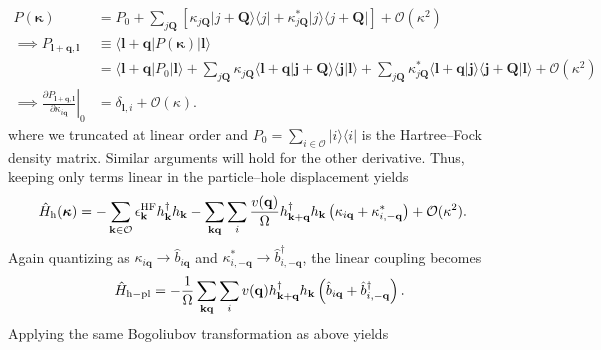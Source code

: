 \begin{align}
    P(\boldsymbol{\kappa})
    &=
    P_0
    +
    \sum_{j\mathbf Q}
    \left[
        \kappa_{j\mathbf Q}
        |j+\mathbf Q\rangle\langle j|
        +
        \kappa_{j\mathbf Q}^{*}
        |j\rangle\langle j+\mathbf Q|
    \right]
    +
    \mathcal O(\kappa^2)\\
\implies     P_{\mathbf l+\mathbf q,\mathbf l}
    &\equiv
    \langle \mathbf l+\mathbf q|
    P(\boldsymbol{\kappa})
    |\mathbf l\rangle
    \\
    &=
    \langle \mathbf l+\mathbf q|
    P_0
    |\mathbf l\rangle+
    \sum_{j\mathbf Q}
    \kappa_{j\mathbf Q}
    \langle \mathbf l+\mathbf q
    |\mathbf j+\mathbf Q\rangle
    \langle \mathbf j|\mathbf l\rangle+
    \sum_{j\mathbf Q}
    \kappa_{j\mathbf Q}^{*}
    \langle \mathbf l+\mathbf q
    |\mathbf j\rangle
    \langle \mathbf j+\mathbf Q|\mathbf l\rangle
    +
    \mathcal O(\kappa^2)\\
    \implies
    \left.
    \frac{\partial
    P_{\mathbf l+\mathbf q,\mathbf l}}
    {\partial\kappa_{i\mathbf q}}
    \right|_0
    &=
        \delta_{\mathbf l,i} + \mathcal O(\kappa).
\end{align}
where we truncated at linear order and $P_0=\sum_{i\in\mathcal O}|i\rangle\langle i|$ is the Hartree--Fock density matrix. Similar arguments will hold for the other derivative. Thus, keeping only terms linear in the particle--hole displacement yields
\begin{align}
    \hat H_{\rm h}(\boldsymbol{\kappa})
    &= -
    \sum_{\mathbf k\in\mathcal O}
    \epsilon_{\mathbf k}^{\rm HF}
    h_{\mathbf k}^{\dagger}h_{\mathbf k}
-
    \sum_{\mathbf k\mathbf q}
    \sum_i
    \frac{v(\mathbf q)}{\Omega}
    h_{\mathbf k+\mathbf q}^{\dagger}h_{\mathbf k}
    \left(
        \kappa_{i\mathbf q}
        +
        \kappa_{i,-\mathbf q}^{*}
    \right)
    +
    \mathcal O(\kappa^2).
    \label{eq:hole_hamiltonian_linear_kappa}
\end{align}
Again quantizing as $\kappa_{i\mathbf q} \to \hat b_{i\mathbf q}$ and $\kappa_{i,-\mathbf q}^{*} \to \hat b_{i,-\mathbf q}^{\dagger}$, 
the linear coupling becomes
\begin{equation}
    \hat H_{\rm h-pl}
    =-\frac{1}{\Omega}
    \sum_{\mathbf k\mathbf q}
    \sum_i
    v(\mathbf q)
    h_{\mathbf k+\mathbf q}^{\dagger}h_{\mathbf k}
    \left(
        \hat b_{i\mathbf q}
        +
        \hat b_{i,-\mathbf q}^{\dagger}
    \right).
\end{equation}
Applying the same Bogoliubov transformation as above yields
